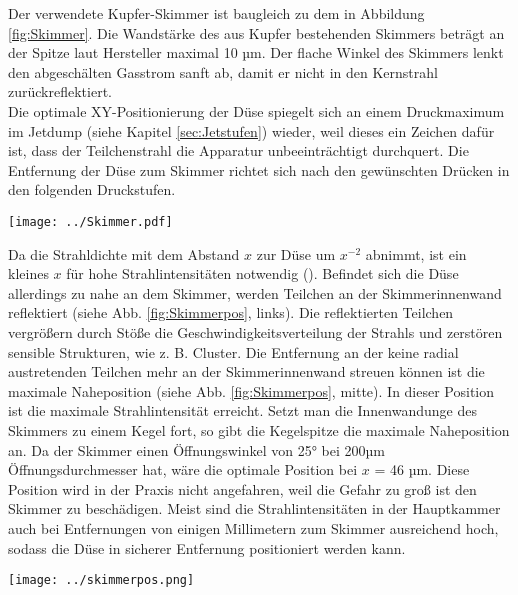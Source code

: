 Der verwendete Kupfer-Skimmer ist baugleich zu dem in Abbildung \ref{fig:Skimmer}. Die Wandstärke des aus Kupfer bestehenden Skimmers beträgt an der Spitze laut Hersteller maximal 10 µm. Der flache Winkel des Skimmers lenkt den abgeschälten Gasstrom sanft ab, damit er nicht in den Kernstrahl zurückreflektiert.\\
Die optimale XY-Positionierung der Düse spiegelt sich an einem Druckmaximum im Jetdump (siehe Kapitel \ref{sec:Jetstufen}) wieder, weil dieses ein Zeichen dafür ist, dass der Teilchenstrahl die Apparatur unbeeinträchtigt durchquert. Die Entfernung der Düse zum Skimmer richtet sich nach den gewünschten Drücken in den folgenden Druckstufen.
\begin{center}
\begin{minipage}{\linewidth}
\centering
\texttt{[image: ../Skimmer.pdf]}%
 \label{fig:Skimmer}
\end{minipage} 
\end{center} 
 Da die Strahldichte mit dem Abstand $x$ zur Düse um $x^{-2}$ abnimmt, ist ein kleines $x$ für hohe Strahlintensitäten notwendig  (\cite{hagena1981nucleation}). Befindet sich die Düse allerdings zu nahe an dem Skimmer, werden Teilchen an der Skimmerinnenwand reflektiert (siehe Abb. \ref{fig:Skimmerpos}, links). Die reflektierten Teilchen vergrößern durch Stöße die Geschwindigkeitsverteilung der Strahls und zerstören sensible Strukturen, wie z. B. Cluster. Die Entfernung an der keine radial austretenden Teilchen mehr an der Skimmerinnenwand streuen können ist die maximale Naheposition (siehe Abb. \ref{fig:Skimmerpos}, mitte). In dieser Position ist die maximale Strahlintensität erreicht. Setzt man die Innenwandunge des Skimmers zu einem Kegel fort, so gibt die Kegelspitze die maximale Naheposition an. Da der Skimmer einen Öffnungswinkel von 25° bei 200µm Öffnungsdurchmesser hat, wäre die optimale Position bei $x$ = 46 µm. Diese Position wird in der Praxis nicht angefahren, weil die Gefahr zu groß ist den Skimmer zu beschädigen. 
Meist sind die Strahlintensitäten in der Hauptkammer auch bei Entfernungen von einigen Millimetern zum Skimmer ausreichend hoch, sodass die Düse in sicherer Entfernung positioniert werden kann.  

 
\begin{center}
\begin{minipage}{\linewidth}
\centering
\texttt{[image: ../skimmerpos.png]}%
 \label{fig:Skimmerpos}
\end{minipage} 
\end{center} 

